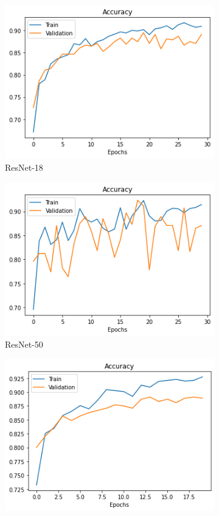 \documentclass{article}
\begin{document}
\begin{figure}[H]
    \centering
    \begin{subfigure}[b]{0.30\textwidth}
            \centering
            \includegraphics[width=.85\linewidth]{images/resnet18_acc}
            \caption{ResNet-18}
            \label{ResNet-18}
    \end{subfigure}%
    \begin{subfigure}[b]{0.30\textwidth}
            \centering
            \includegraphics[width=.85\linewidth]{images/resnset50_acc}
            \caption{ResNet-50}
            \label{ResNet-50}
    \end{subfigure}%
    \begin{subfigure}[b]{0.30\textwidth}
            \centering
            \includegraphics[width=.85\linewidth]{images/densenet121_acc}

\end{subfigure}
\end{figure}
\end{document}
